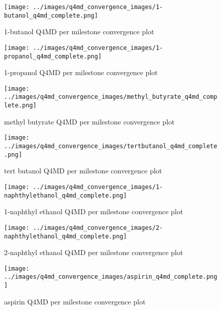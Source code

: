 \begin{figure}
    \texttt{[image: ../images/q4md\_convergence\_images/1-butanol\_q4md\_complete.png]}
    \caption{1-butanol Q4MD per milestone convergence plot}
    \label{fig:1-butanol_q4md_conv}
\end{figure}

\begin{figure}
    \texttt{[image: ../images/q4md\_convergence\_images/1-propanol\_q4md\_complete.png]}
    \caption{1-propanol Q4MD per milestone convergence plot}
    \label{fig:1-propanol_q4md_conv}
\end{figure}

\begin{figure}
    \texttt{[image: ../images/q4md\_convergence\_images/methyl\_butyrate\_q4md\_complete.png]}
    \caption{methyl butyrate Q4MD per milestone convergence plot}
    \label{fig:methyl_butyrate_q4md_conv}
\end{figure}

\begin{figure}
    \texttt{[image: ../images/q4md\_convergence\_images/tertbutanol\_q4md\_complete.png]}
    \caption{tert butanol Q4MD per milestone convergence plot}
    \label{fig:tert_butanol_q4md_conv}
\end{figure}

\begin{figure}
    \texttt{[image: ../images/q4md\_convergence\_images/1-naphthylethanol\_q4md\_complete.png]}
    \caption{1-naphthyl ethanol Q4MD per milestone convergence plot}
    \label{fig:1-naphthylethanol_q4md_conv}
\end{figure}

\begin{figure}
    \texttt{[image: ../images/q4md\_convergence\_images/2-naphthylethanol\_q4md\_complete.png]}
    \caption{2-naphthyl ethanol Q4MD per milestone convergence plot}
    \label{fig:2-naphthylethanol_q4md_conv}
\end{figure}

\begin{figure}
    \texttt{[image: ../images/q4md\_convergence\_images/aspirin\_q4md\_complete.png]}
    \caption{aspirin Q4MD per milestone convergence plot}
    \label{fig:aspirin_q4md_conv}
\end{figure}